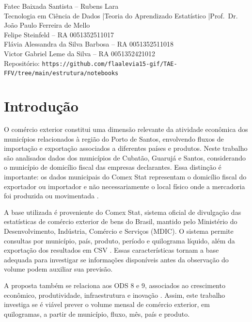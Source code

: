 \documentclass[
  article,12pt,oneside,a4paper,english,brazil
]{abntex2}
\newcommand{\nomecurso}{Tecnologia em Ciência de Dados}
\newcommand{\nomedisciplina}{Teoria do Aprendizado Estatístico}
\newcommand{\nomeprofessor}{Prof.\ Dr. João Paulo Ferreira de Mello}
\newcommand{\integrantes}{%
  Felipe Steinfeld -- RA 0051352511017 \\
  Flávia Alessandra da Silva Barbosa -- RA 0051352511018 \\
  Victor Gabriel Leme da Silva -- RA 0051352421012%
}
\begin{document}
\frenchspacing
\maketitle

\begin{center}
  \small
  Fatec Baixada Santista -- Rubens Lara \\
  \nomecurso{} \quad|\quad \nomedisciplina{} \quad|\quad \nomeprofessor{} \\[0.4em]
  \integrantes \\[0.4em]
  Repositório: \texttt{https://github.com/flaalevia15-gif/TAE-FFV/tree/main/estrutura/notebooks}
\end{center}

\textual

\section{Introdução}

O comércio exterior constitui uma dimensão relevante da atividade econômica
dos municípios relacionados à região do Porto de Santos, envolvendo fluxos de
importação e exportação associados a diferentes países e produtos. Neste
trabalho são analisados dados dos municípios de Cubatão, Guarujá e Santos,
considerando o município de domicílio fiscal das empresas declarantes. Essa
distinção é importante: os dados municipais do Comex Stat representam o
domicílio fiscal do exportador ou importador e não necessariamente o local
físico onde a mercadoria foi produzida ou movimentada
\citep{mdic_comexstat_faq}.

A base utilizada é proveniente do Comex Stat, sistema oficial de divulgação
das estatísticas de comércio exterior de bens do Brasil, mantido pelo
Ministério do Desenvolvimento, Indústria, Comércio e Serviços (MDIC). O
sistema permite consultas por município, país, produto, período e quilograma
líquido, além da exportação dos resultados em CSV
\cite{mdic_comexstat,mdic_dados_abertos}. Essas características tornam a base
adequada para investigar se informações disponíveis antes da observação do
volume podem auxiliar sua previsão.

A proposta também se relaciona aos ODS 8 e 9, associados ao crescimento
econômico, produtividade, infraestrutura e inovação
\cite{onu_ods8,onu_ods9}. Assim, este trabalho investiga se é viável prever o
volume mensal de comércio exterior, em quilogramas, a partir de município,
fluxo, mês, país e produto.
\end{document}
